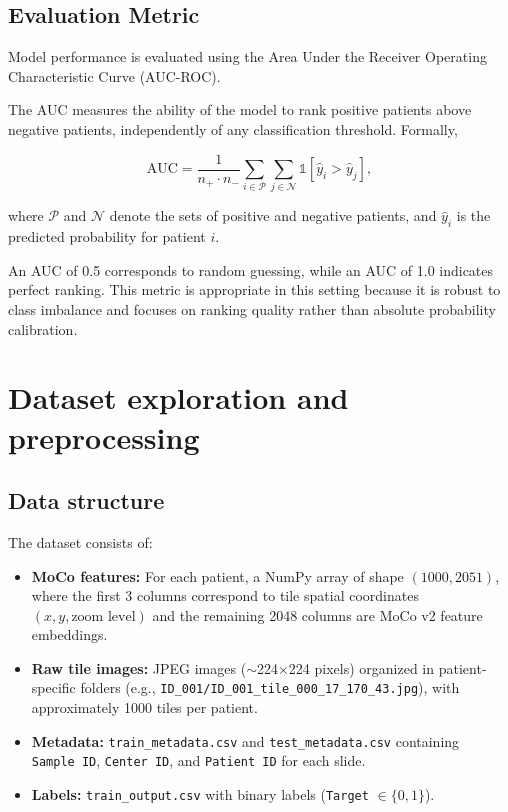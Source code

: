 \documentclass[11pt,a4paper]{article}
\begin{document}
\subsection{Evaluation Metric}

Model performance is evaluated using the Area Under the Receiver Operating Characteristic Curve (AUC-ROC).

The AUC measures the ability of the model to rank positive patients above negative patients, independently of any classification threshold. 
Formally,

\[
\text{AUC} = 
\frac{1}{n_{+} \cdot n_{-}}
\sum_{i \in \mathcal{P}}
\sum_{j \in \mathcal{N}}
\mathbb{1} \left[ \hat{y}_i > \hat{y}_j \right],
\]

where $\mathcal{P}$ and $\mathcal{N}$ denote the sets of positive and negative patients, and $\hat{y}_i$ is the predicted probability for patient $i$.

An AUC of 0.5 corresponds to random guessing, while an AUC of 1.0 indicates perfect ranking. 
This metric is appropriate in this setting because it is robust to class imbalance and focuses on ranking quality rather than absolute probability calibration.

\newpage
\section{Dataset exploration and preprocessing}
\label{sec:data}

\subsection{Data structure}

The dataset consists of:

\begin{itemize}[nosep]
    \item \textbf{MoCo features:} For each patient, a NumPy array of shape $(1000, 2051)$, where the first 3 columns correspond to tile spatial coordinates $(x, y, \text{zoom level})$ and the remaining 2048 columns are MoCo v2 feature embeddings.
    \item \textbf{Raw tile images:} JPEG images ($\sim$224$\times$224 pixels) organized in patient-specific folders (e.g., \texttt{ID\_001/ID\_001\_tile\_000\_17\_170\_43.jpg}), with approximately 1000 tiles per patient.
    \item \textbf{Metadata:} \texttt{train\_metadata.csv} and \texttt{test\_metadata.csv} containing \texttt{Sample~ID}, \texttt{Center~ID}, and \texttt{Patient~ID} for each slide.
    \item \textbf{Labels:} \texttt{train\_output.csv} with binary labels (\texttt{Target} $\in \{0, 1\}$).
\end{itemize}
\end{document}

